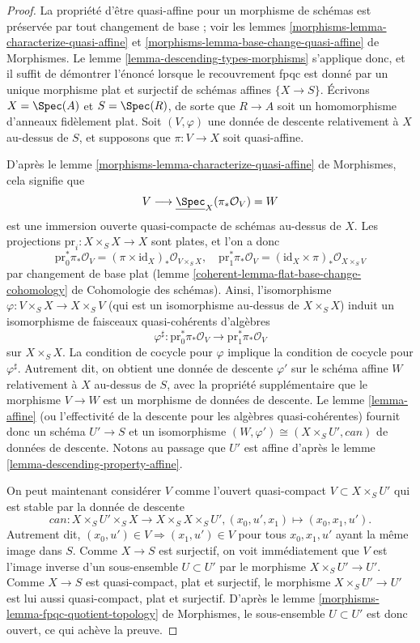 \begin{proof}
La propriété d'être quasi-affine pour un morphisme de schémas est préservée
par tout changement de base ; voir les lemmes
\ref{morphisms-lemma-characterize-quasi-affine} et
\ref{morphisms-lemma-base-change-quasi-affine} de Morphismes. Le
lemme \ref{lemma-descending-types-morphisms} s'applique donc, et il suffit de
démontrer l'énoncé lorsque le recouvrement fpqc est donné par un unique
morphisme plat et surjectif de schémas affines $\{X \to S\}$. Écrivons
$X = \Spec(A)$ et $S = \Spec(R)$, de sorte que $R \to A$ soit un
homomorphisme d'anneaux fidèlement plat. Soit $(V, \varphi)$ une donnée de
descente relativement à $X$ au-dessus de $S$, et supposons que
$\pi : V \to X$ soit quasi-affine.

\medskip\noindent
D'après le
lemme \ref{morphisms-lemma-characterize-quasi-affine} de Morphismes, cela signifie que
$$
V \longrightarrow \underline{\Spec}_X(\pi_*\mathcal{O}_V) = W
$$
est une immersion ouverte quasi-compacte de schémas au-dessus de $X$. Les
projections $\text{pr}_i : X \times_S X \to X$ sont plates, et l'on a donc
$$
\text{pr}_0^*\pi_*\mathcal{O}_V =
(\pi \times \text{id}_X)_*\mathcal{O}_{V \times_S X}, \quad
\text{pr}_1^*\pi_*\mathcal{O}_V =
(\text{id}_X \times \pi)_*\mathcal{O}_{X \times_S V}
$$
par changement de base plat (lemme
\ref{coherent-lemma-flat-base-change-cohomology} de Cohomologie des schémas). Ainsi,
l'isomorphisme $\varphi : V \times_S X \to X \times_S V$ (qui est un
isomorphisme au-dessus de $X \times_S X$) induit un isomorphisme de faisceaux
quasi-cohérents d'algèbres
$$
\varphi^\sharp :
\text{pr}_0^*\pi_*\mathcal{O}_V
\longrightarrow
\text{pr}_1^*\pi_*\mathcal{O}_V
$$
sur $X \times_S X$. La condition de cocycle pour $\varphi$ implique la
condition de cocycle pour $\varphi^\sharp$. Autrement dit, on obtient une
donnée de descente $\varphi'$ sur le schéma affine $W$ relativement à $X$
au-dessus de $S$, avec la propriété supplémentaire que le morphisme $V \to W$
est un morphisme de données de descente. Le lemme \ref{lemma-affine} (ou
l'effectivité de la descente pour les algèbres quasi-cohérentes) fournit donc
un schéma $U' \to S$ et un isomorphisme
$(W, \varphi') \cong (X \times_S U', can)$ de données de descente. Notons au
passage que $U'$ est affine d'après le
lemme \ref{lemma-descending-property-affine}.

\medskip\noindent
On peut maintenant considérer $V$ comme l'ouvert quasi-compact
$V \subset X \times_S U'$ qui est stable par la donnée de descente
$$
can : X \times_S U' \times_S X \to X \times_S X \times_S U',
(x_0, u', x_1) \mapsto (x_0, x_1, u').
$$
Autrement dit, $(x_0, u') \in V \Rightarrow (x_1, u') \in V$ pour tous
$x_0, x_1, u'$ ayant la même image dans $S$. Comme $X \to S$ est surjectif,
on voit immédiatement que $V$ est l'image inverse d'un sous-ensemble
$U \subset U'$ par le morphisme $X \times_S U' \to U'$. Comme $X \to S$ est
quasi-compact, plat et surjectif, le morphisme $X \times_S U' \to U'$ est lui
aussi quasi-compact, plat et surjectif. D'après le
lemme \ref{morphisms-lemma-fpqc-quotient-topology} de Morphismes, le sous-ensemble
$U \subset U'$ est donc ouvert, ce qui achève la preuve.
\end{proof}
